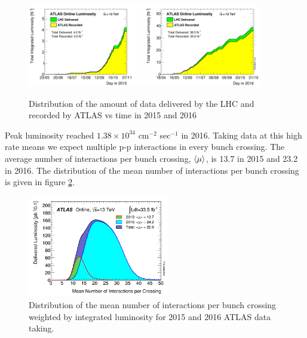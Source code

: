\begin{figure}[htb]
  \begin{center}
    \includegraphics[width=0.45\textwidth]{figures/Data/IntLumi2015.png}\hspace{0.05\textwidth}
    \includegraphics[width=0.45\textwidth]{figures/Data/IntLumi2016.png}\hspace{0.05\textwidth}
\end{center}
\caption{Distribution of the amount of data delivered by the LHC and recorded by ATLAS vs time in 2015 and 2016  }
\label{fig:data2015-2016} 
\end{figure}

\indent Peak luminosity reached $1.38 \times 10^{34}$  cm$^{-2}$ sec$^{-1}$ in 2016.  Taking data at this high rate means we expect multiple p-p interactions in every bunch crossing.  The average number of interactions per bunch crossing, $\braket{\mu}$, is 13.7 in 2015 and 23.2 in 2016.  The distribution of the mean number of interactions per bunch crossing is given in figure \ref{fig:nVtx}.   \\

\begin{figure}[htb]
  \begin{center}
    \includegraphics[width=0.55\textwidth]{figures/Data/mu_2015_2016_LHCC.png}\hspace{0.05\textwidth}
\end{center}
\caption{Distribution of the mean number of interactions per bunch crossing weighted by integrated luminosity for 2015 and 2016 ATLAS data taking.    }
\label{fig:nVtx} 
\end{figure}

